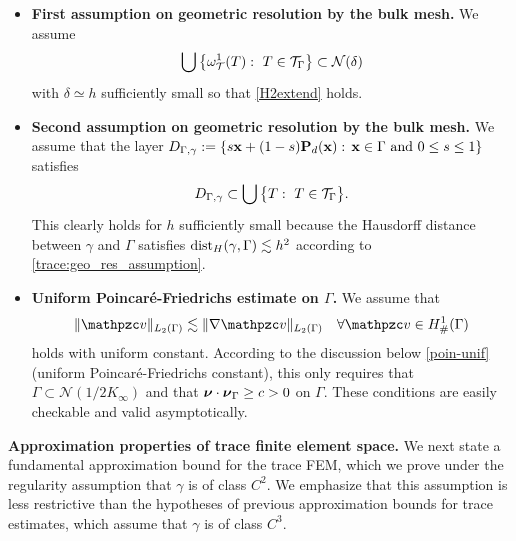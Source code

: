 \begin{itemize}
\item {\bf First assumption on geometric resolution by the bulk mesh.} We assume
%
\begin{equation}\label{e:TGamma}
\bigcup \big\{\omega_{\mathcal{T}}^1(T): ~ T \in \mathcal{T}_{\Gamma}\big\} \subset \mathcal{N}(\delta)
\end{equation}
%
with $\delta \simeq h$ sufficiently small so that \eqref{H2extend} holds.
%
\item {\bf Second assumption on geometric resolution by the bulk mesh.} We assume that the layer $D_{\Gamma, \gamma}:=\{s{\bf x} + (1-s) {\bf P}_d({\bf x}): \, {\bf x} \in \Gamma \hbox{ and } 0 \le s \le 1\}$ satisfies 
\begin{align}
\label{ass:skinlayer}
D_{\Gamma, \gamma} \subset \bigcup \big\{T: ~T\in\mathcal{T}_\Gamma\big\}.
\end{align}
%
This clearly holds for $h$ sufficiently small because the Hausdorff distance between $\gamma$ and $\Gamma$ satisfies $\operatorname{dist}_H(\gamma,\Gamma)\lesssim h^2$ according to \eqref{trace:geo_res_assumption}.

\item
{\bf Uniform Poincar\'e-Friedrichs estimate on $\Gamma$.} We assume that
%
\begin{align} \label{trace-poin-unif}
\|\tv\|_{L_2(\Gamma)} \lesssim \|\nabla \tv\|_{L_2(\Gamma)}
\quad\forall \tv \in H^1_\#(\Gamma)
\end{align}
%
holds with uniform constant. According to the discussion below \eqref{poin-unif} (uniform Poincar\'e-Friedrichs constant), this only requires that $\Gamma \subset \mathcal{N}(1/2K_\infty)$ and that ${\boldsymbol \nu}\cdot {\boldsymbol \nu}_\Gamma \ge c >0$ on $\Gamma$. These conditions are easily checkable and valid asymptotically.
%
\end{itemize}

\medskip\noindent
{\bf Approximation properties of trace finite element space.}
%
We next state a fundamental approximation bound for the trace FEM, which we prove under the regularity assumption that $\gamma$ is of class $C^2$. We emphasize that this assumption is less restrictive than the hypotheses of previous approximation bounds for trace estimates, which assume that $\gamma$ is of class $C^3$.  

